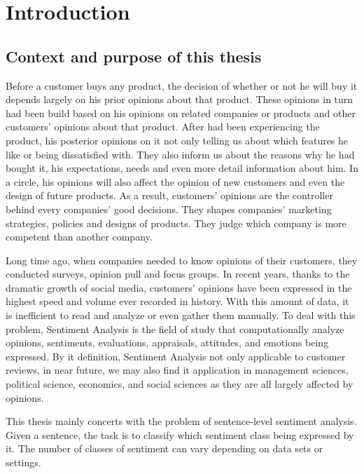 \chapter{Introduction}
\section{Context and purpose of this thesis}
Before a customer buys any product, the decision of whether or not he will buy it depends largely on his prior opinions about that product. 
These opinions in turn had been build based on his opinions on related companies or products and other customers' opinions about that product.  
After had been experiencing the product, his posterior opinions on it not only telling us about which features he like or being dissatisfied with.
They also inform us about the reasons why he had bought it, his expectations, needs and even more detail information about him.
In a circle, his opinions will also affect the opinion of new customers and even the design of future products.
As a result, customers' opinions are the controller behind every companies' good decisions. 
They shapes companies' marketing strategies, policies and designs of products.
They judge which company is more competent than another company.

Long time ago, when companies needed to know opinions of their customers, they conducted surveys, opinion pull and focus groups\cite{liu2012sentiment}. 
In recent years, thanks to the dramatic growth of social media, customers' opinions have been expressed in the highest speed and volume ever recorded in history.
With this amount of data, it is inefficient to read and analyze or even gather them manually.
To deal with this problem, Sentiment Analysis is the field of study that computationally analyze opinions, sentiments, evaluations, appraisals, attitudes, and emotions being expressed\cite{liu2012sentiment}.
By it definition, Sentiment Analysis not only applicable to customer reviews, in near future, we may also find it application in management sciences, political science, economics, and social sciences as they are all largely affected by opinions\cite{liu2012sentiment}. 

This thesis mainly concerts with the problem of sentence-level sentiment analysis. 
Given a sentence, the task is to classify which sentiment class being expressed by it\cite{liu2012sentiment}.
The number of classes of sentiment can vary depending on data sets or settings\cite{Rotten-Tomato}\cite{socher2013recursive}.

